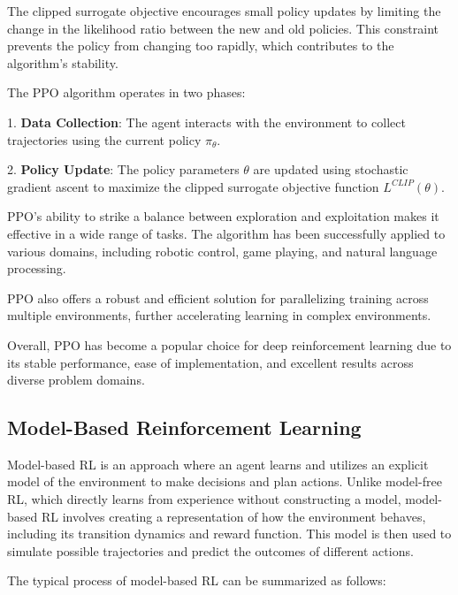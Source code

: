 The clipped surrogate objective encourages small policy updates by limiting the change in the likelihood ratio between the new and old policies. This constraint prevents the policy from changing too rapidly, which contributes to the algorithm's stability.

The PPO algorithm operates in two phases:

1.
\textbf{Data Collection}: The agent interacts with the environment to collect trajectories using the current policy \(\pi_{\theta}\).

2.
\textbf{Policy Update}: The policy parameters \(\theta\) are updated using stochastic gradient ascent to maximize the clipped surrogate objective function \(L^{CLIP}(\theta)\).

PPO's ability to strike a balance between exploration and exploitation makes it effective in a wide range of tasks. The algorithm has been successfully applied to various domains, including robotic control, game playing, and natural language processing.

PPO also offers a robust and efficient solution for parallelizing training across multiple environments, further accelerating learning in complex environments.

Overall, PPO has become a popular choice for deep reinforcement learning due to its stable performance, ease of implementation, and excellent results across diverse problem domains.

\subsection{Model-Based Reinforcement Learning}\label{subsec:model-based-reinforcement-learning}
Model-based RL is an approach where an agent learns and utilizes an explicit model of the environment to make decisions and plan actions.
Unlike model-free RL, which directly learns from experience without constructing a model, model-based RL involves creating a representation of how the environment behaves, including its transition dynamics and reward function.
This model is then used to simulate possible trajectories and predict the outcomes of different actions.

The typical process of model-based RL can be summarized as follows:

